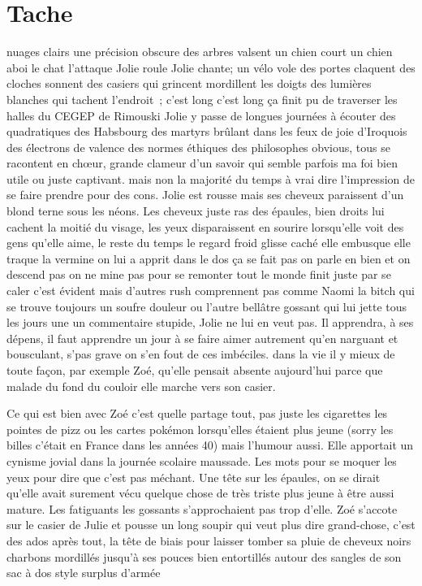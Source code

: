 \documentclass{article}
\begin{document}
 \section*{Tache}
 nuages clairs une précision obscure des arbres valsent un chien court un
 chien aboi le chat l’attaque Jolie roule Jolie chante; un vélo vole des portes
 claquent des cloches sonnent des casiers qui grincent mordillent les doigts
 des lumières blanches qui tachent l’endroit ; c’est long c’est long ça finit
 pu de traverser les halles du  CEGEP de Rimouski Jolie y passe de
 longues journées à écouter des quadratiques des Habsbourg des martyrs brûlant
 dans les feux de joie d’Iroquois des électrons de valence des normes éthiques
 des philosophes obvious, tous se racontent en chœur, grande clameur d’un
 savoir qui semble parfois ma foi bien utile ou juste captivant. mais non la
 majorité du temps à vrai dire l’impression de se faire prendre pour des cons.
 Jolie est rousse mais ses cheveux paraissent d’un blond terne sous les néons.
 Les cheveux juste ras des épaules, bien droits lui cachent la moitié du
 visage, les yeux disparaissent en sourire lorsqu’elle voit des gens qu’elle
 aime, le reste du temps le regard froid glisse caché elle embusque elle traque
 la vermine on lui a apprit dans le dos ça se fait pas on parle en bien et on
 descend pas on ne mine pas pour se remonter tout le monde finit juste par se
 caler c’est évident mais d’autres rush comprennent pas comme Naomi la bitch
 qui se trouve toujours un soufre douleur ou l’autre bellâtre gossant qui lui
 jette tous les jours une un commentaire stupide, Jolie ne lui en veut pas. Il
 apprendra, à ses dépens, il faut apprendre un jour à se faire aimer autrement
 qu’en narguant et bousculant, s’pas grave on s’en fout de ces imbéciles. dans
 la vie il y mieux de toute façon, par exemple Zoé, qu’elle pensait absente
 aujourd’hui parce que malade du fond du couloir elle marche vers son casier.

Ce qui est bien avec Zoé c’est quelle partage tout, pas juste les cigarettes
les pointes de pizz ou les cartes pokémon lorsqu’elles étaient plus jeune
(sorry les billes c’était en France dans les années 40) mais l’humour aussi.
Elle apportait un cynisme jovial dans la journée scolaire maussade. Les mots
pour se moquer les yeux pour dire que c’est pas méchant.  Une tête sur les
épaules, on se dirait qu’elle avait surement vécu quelque chose de très triste
plus jeune à être aussi mature. Les fatiguants les gossants s’approchaient pas
trop d’elle. Zoé s’accote sur le casier de Julie et pousse un long soupir qui
veut plus dire grand-chose, c’est des ados après tout, la tête de biais pour
laisser tomber sa pluie de cheveux noirs charbons mordillés jusqu'à ses pouces
bien entortillés autour des sangles de son sac à dos style surplus d'armée
\end{document}
